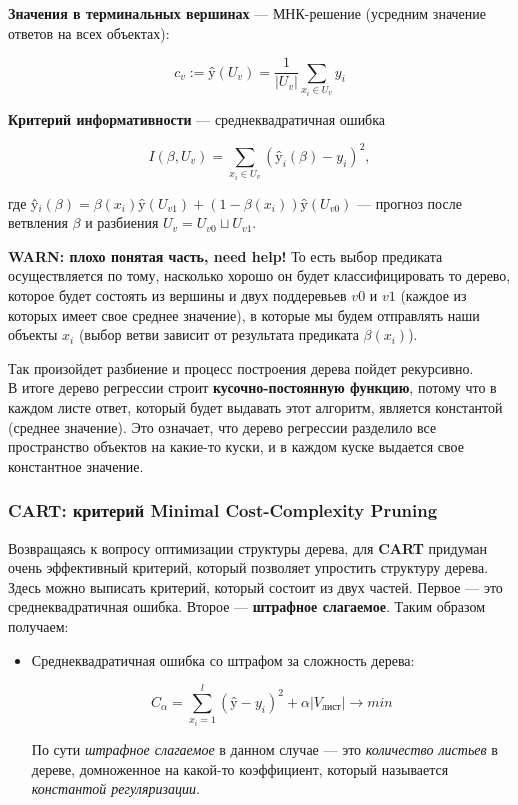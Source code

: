 \documentclass{article}
\begin{document}
\textbf{Значения в терминальных вершинах} --- МНК-решение (усредним значение ответов на всех объектах):

$$c_v := \text{\^y}(U_v) = \frac{1}{|U_v|}\sum\limits_{x_i \in U_v} y_i$$

\textbf{Критерий информативности} --- среднеквадратичная ошибка

$$I(\beta, U_v) = \sum\limits_{x_i \in U_v}(\text{\^y}_i(\beta) - y_i)^2,$$

где \^y$_i(\beta) = \beta(x_i)\text{\^y}(U_{v1}) + (1 - \beta(x_i))\text{\^y}(U_{v0})$ --- прогноз после ветвления $\beta$ и разбиения $U_v = U_{v0} \sqcup U_{v1}$.

\textbf{WARN: плохо понятая часть, need help! }
То есть выбор предиката осуществляется по тому, насколько хорошо он будет классифицировать то дерево, которое будет состоять из вершины и двух поддеревьев $v0$ и $v1$ (каждое из которых имеет свое среднее значение), в которые мы будем отправлять наши объекты $x_i$ (выбор ветви зависит от результата предиката $\beta(x_i)$).

Так произойдет разбиение и процесс построения дерева пойдет рекурсивно.
\\

В итоге дерево регрессии строит \textbf{кусочно-постоянную функцию}, потому что в каждом листе ответ, который будет выдавать этот алгоритм, является константой (среднее значение). Это означает, что дерево регрессии разделило все пространство объектов на какие-то куски, и в каждом куске выдается свое константное значение.

\subsubsection{CART: критерий Minimal Cost-Complexity Pruning}

Возвращаясь к вопросу оптимизации структуры дерева, для \textbf{CART} придуман очень эффективный критерий, который позволяет упростить структуру дерева.
\\

Здесь можно выписать критерий, который состоит из двух частей. Первое --- это среднеквадратичная ошибка. Второе --- \textbf{штрафное слагаемое}. Таким образом получаем:

\begin{itemize}
\item Среднеквадратичная ошибка со штрафом за сложность дерева:

$$C_\alpha =
\sum\limits_{x_i = 1}^l(\text{\^y} - y_i)^2 + \alpha|V_\text{лист}| \rightarrow min$$

По сути \textit{штрафное слагаемое} в данном случае --- это \textit{количество листьев} в дереве, домноженное на какой-то коэффициент, который называется \textit{константой регуляризации}.
\end{itemize}
\end{document}
